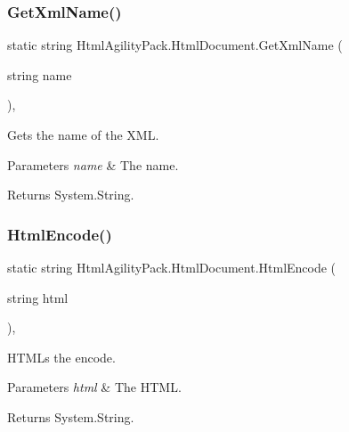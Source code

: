 \subsubsection{\texorpdfstring{Get\+Xml\+Name()}{GetXmlName()}}
{\footnotesize\ttfamily static string Html\+Agility\+Pack.\+Html\+Document.\+Get\+Xml\+Name (\begin{DoxyParamCaption}\item[{string}]{name }\end{DoxyParamCaption})\hspace{0.3cm}{\ttfamily [inline]}, {\ttfamily [static]}}



Gets the name of the X\+ML. 


\begin{DoxyParams}{Parameters}
{\em name} & The name.\\
\hline
\end{DoxyParams}
\begin{DoxyReturn}{Returns}
System.\+String.
\end{DoxyReturn}
\mbox{\label{class_html_agility_pack_1_1_html_document_a0fcf3caaf1a43613da81853b334cb6b0}} 
\subsubsection{\texorpdfstring{Html\+Encode()}{HtmlEncode()}}
{\footnotesize\ttfamily static string Html\+Agility\+Pack.\+Html\+Document.\+Html\+Encode (\begin{DoxyParamCaption}\item[{string}]{html }\end{DoxyParamCaption})\hspace{0.3cm}{\ttfamily [inline]}, {\ttfamily [static]}}



H\+T\+M\+Ls the encode. 


\begin{DoxyParams}{Parameters}
{\em html} & The H\+T\+ML.\\
\hline
\end{DoxyParams}
\begin{DoxyReturn}{Returns}
System.\+String.
\end{DoxyReturn}

